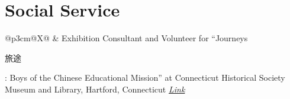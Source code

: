 \documentclass[letterpaper,11pt, english]{article}
\begin{document}
\section{Social Service}
\begin{flushleft}
  \begin{tabularx}{\textwidth}{@{}p{3cm}@{\hspace{0.01cm}}X@{}}
     & Exhibition Consultant and Volunteer for “Journeys \begin{CJK*}{UTF8}{gbsn}旅途\end{CJK*}: Boys of the Chinese Educational Mission” at Connecticut Historical Society Museum and Library, Hartford, Connecticut \emph{\href{https://chs.org/exhibition/journeys/ }{\color{blue}Link}}\\
  \end{tabularx}
\end{flushleft}

\newpage
\end{document}
